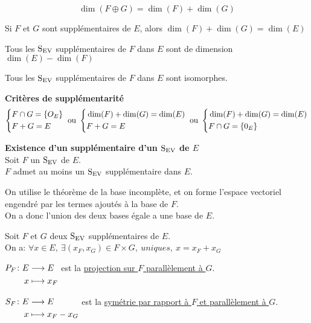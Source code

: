 \documentclass[12pt,twoside,a4paper]{article}
\begin{document}
		\begin{coro}
			$$\dim(F\oplus G)=\dim(F)+\dim(G)$$
		\end{coro}
		\begin{coro}
			\begin{liste}
				\item Si $F$ et $G$ sont suppl\'ementaires de $E$, alors $\dim(F)+\dim(G)=\dim(E)$
				\item Tous les $\mathrm{S}_\mathrm{EV}$ suppl\'ementaires de $F$ dans $E$ sont de dimension $\dim(E)-\dim(F)$
				\item Tous les $\mathrm{S}_\mathrm{EV}$ suppl\'ementaires de $F$ dans $E$ sont isomorphes.
			\end{liste}
		\end{coro}
		\begin{flushleft}
			\textbf{Crit\`eres de suppl\'ementarit\'e}
			$$ \left\lbrace \begin{aligned}
			& F\cap G=\{O_E\}\\ & F+G=E
			\end{aligned}\right. \text{ ou } 
			\left\lbrace \begin{aligned}
			& \dim(F)+\dim(G)=\dim(E)\\& F+G=E
			\end{aligned}\right. \text{ ou }
			\left\lbrace \begin{aligned}
			& \dim(F)+\dim(G)=\dim(E)\\ & F\cap G=\{0_E \}
			\end{aligned}\right. $$
		\end{flushleft}
		\begin{prop}
			\textbf{Existence d'un suppl\'ementaire d'un $\mathrm{S}_\mathrm{EV}$ de $E$}\\
			Soit $F$ un $\mathrm{S}_\mathrm{EV}$ de $E$.\\
			$F$ admet au moins un $\mathrm{S}_\mathrm{EV}$ suppl\'ementaire dans $E$.
		\end{prop}
		\begin{preuve}
			On utilise le th\'eor\`eme de la base incompl\`ete, et on forme l'espace vectoriel engendr\'e par les termes ajout\'es \`a la base de $F$.\\
			On a donc l'union des deux bases \'egale a une base de $E$.
		\end{preuve}
		\begin{defi}
			Soit $F$ et $G$ deux $\mathrm{S}_\mathrm{EV}$ suppl\'ementaires de $E$.\\
			On a: $\forall x\in E,\ \exists (x_F,x_G)\in F\times G,\ uniques,\ x=x_F+x_G$
			\begin{liste}
				\item $\begin{aligned}[t]P_F\colon E&\longrightarrow E \\x&\longmapsto x_F\end{aligned}$ est la \underline{projection sur $F$ parall\`element \`a $G$}.
				\item $\begin{aligned}[t]S_F\colon E&\longrightarrow E \\x&\longmapsto x_F-x_G\end{aligned}$ est la \underline{sym\'etrie par rapport \`a $F$ et parall\`element \`a $G$}.
			\end{liste}
		\end{defi}
\end{document}
